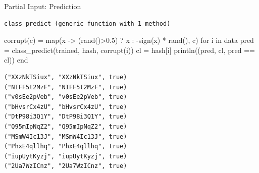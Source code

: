 \documentclass[
  ignorenonframetext,
]{beamer}
\newenvironment{Shaded}{\begin{snugshade}}{\end{snugshade}}
\newcommand{\ControlFlowTok}[1]{\textcolor[rgb]{0.00,0.23,0.31}{#1}}
\newcommand{\FloatTok}[1]{\textcolor[rgb]{0.68,0.00,0.00}{#1}}
\newcommand{\FunctionTok}[1]{\textcolor[rgb]{0.28,0.35,0.67}{#1}}
\newcommand{\KeywordTok}[1]{\textcolor[rgb]{0.00,0.23,0.31}{#1}}
\newcommand{\NormalTok}[1]{\textcolor[rgb]{0.00,0.23,0.31}{#1}}
\newcommand{\OperatorTok}[1]{\textcolor[rgb]{0.37,0.37,0.37}{#1}}
\begin{document}
\begin{frame}[fragile]{Partial Input: Prediction}
\protect\hypertarget{partial-input-prediction}{}
\begin{verbatim}
class_predict (generic function with 1 method)
\end{verbatim}

\begin{Shaded}
\begin{Highlighting}[]
\FunctionTok{corrupt}\NormalTok{(c) }\OperatorTok{=} \FunctionTok{map}\NormalTok{(x }\OperatorTok{{-}\textgreater{}}\NormalTok{ (}\FunctionTok{rand}\NormalTok{()}\OperatorTok{\textgreater{}}\FloatTok{0.5}\NormalTok{) ? x }\OperatorTok{:} \FunctionTok{{-}sign}\NormalTok{(x) }\OperatorTok{*} \FunctionTok{rand}\NormalTok{(), c)}
\ControlFlowTok{for}\NormalTok{ i }\KeywordTok{in}\NormalTok{ data}
\NormalTok{    pred }\OperatorTok{=} \FunctionTok{class\_predict}\NormalTok{(trained, hash, }\FunctionTok{corrupt}\NormalTok{(i))}
\NormalTok{    cl }\OperatorTok{=}\NormalTok{ hash[i]}
    \FunctionTok{println}\NormalTok{((pred, cl, pred }\OperatorTok{==}\NormalTok{ cl))}
\ControlFlowTok{end}
\end{Highlighting}
\end{Shaded}

\begin{verbatim}
("XXzNkTSiux", "XXzNkTSiux", true)
("NIFF5t2MzF", "NIFF5t2MzF", true)
("v0sEe2pVeb", "v0sEe2pVeb", true)
("bHvsrCx4zU", "bHvsrCx4zU", true)
("DtP98i3Q1Y", "DtP98i3Q1Y", true)
("Q95mIpNqZ2", "Q95mIpNqZ2", true)
("MSmW4Ic13J", "MSmW4Ic13J", true)
("PhxE4qllhq", "PhxE4qllhq", true)
("iupUytKyzj", "iupUytKyzj", true)
("2Ua7WzICnz", "2Ua7WzICnz", true)
\end{verbatim}
\end{frame}
\end{document}
